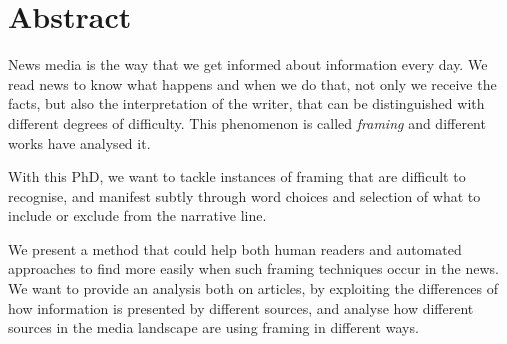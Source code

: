 \chapter*{Abstract}

News media is the way that we get informed about information every day.
We read news to know what happens and when we do that, not only we receive the facts, but also the interpretation of the writer, that can be distinguished with different degrees of difficulty.
This phenomenon is called \emph{framing} and different works have analysed it.

With this PhD, we want to tackle instances of framing that are difficult to recognise, and manifest subtly through word choices and selection of what to include or exclude from the narrative line.

We present a method that could help both human readers and automated approaches to find more easily when such framing techniques occur in the news.
We want to provide an analysis both on articles, by exploiting the differences of how information is presented by different sources, and analyse how different sources in the media landscape are using framing in different ways.
